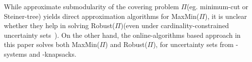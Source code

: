 \documentclass[11pt,letterpaper]{article}
\def\cov{\ensuremath{\Pi}\xspace}
\def\rcov{{\sf Robust(\cov)}\xspace}
\def\mmp{{\sf MaxMin(\cov)}\xspace}
\begin{document}
While approximate submodularity of the covering problem \cov  (eg. minimum-cut or Steiner-tree) yields direct
approximation algorithms for \mmp, it is unclear whether they help in solving \rcov (even under cardinality-constrained
uncertainty sets~\cite{GNR-k-rob}). On the other hand, the online-algorithms based approach in this paper solves both
\mmp and \rcov, for uncertainty sets from -systems and -knapsacks.




\end{document}
